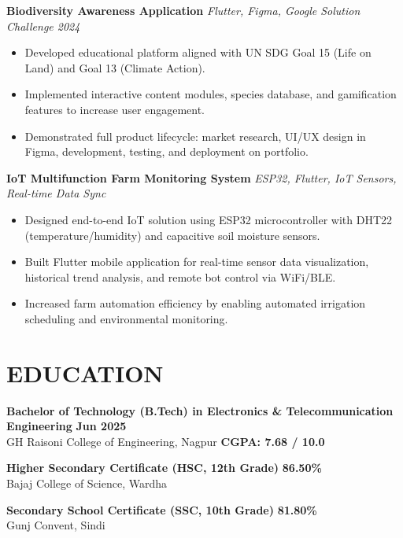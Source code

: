 \documentclass[a4paper,11pt]{article}
\begin{document}
\noindent\textbf{Biodiversity Awareness Application} \hfill \textit{Flutter, Figma, Google Solution Challenge 2024}
\begin{itemize}[leftmargin=*,noitemsep,topsep=2pt,itemsep=2pt]
    \item Developed educational platform aligned with UN SDG Goal 15 (Life on Land) and Goal 13 (Climate Action).
    \item Implemented interactive content modules, species database, and gamification features to increase user engagement.
    \item Demonstrated full product lifecycle: market research, UI/UX design in Figma, development, testing, and deployment on portfolio.
\end{itemize}
\vspace{1.5mm}

\noindent\textbf{IoT Multifunction Farm Monitoring System} \hfill \textit{ESP32, Flutter, IoT Sensors, Real-time Data Sync}
\begin{itemize}[leftmargin=*,noitemsep,topsep=2pt,itemsep=2pt]
    \item Designed end-to-end IoT solution using ESP32 microcontroller with DHT22 (temperature/humidity) and capacitive soil moisture sensors.
    \item Built Flutter mobile application for real-time sensor data visualization, historical trend analysis, and remote bot control via WiFi/BLE.
    \item Increased farm automation efficiency by enabling automated irrigation scheduling and environmental monitoring.
\end{itemize}
\vspace{-2mm}

\section{EDUCATION}

\noindent\textbf{Bachelor of Technology (B.Tech) in Electronics \& Telecommunication Engineering} \hfill \textbf{Jun 2025}\\
GH Raisoni College of Engineering, Nagpur \hfill \textbf{CGPA: 7.68 / 10.0}

\noindent\textbf{Higher Secondary Certificate (HSC, 12th Grade)} \hfill \textbf{86.50\%}\\
Bajaj College of Science, Wardha

\noindent\textbf{Secondary School Certificate (SSC, 10th Grade)} \hfill \textbf{81.80\%}\\
Gunj Convent, Sindi
\vspace{-2mm}
\end{document}
